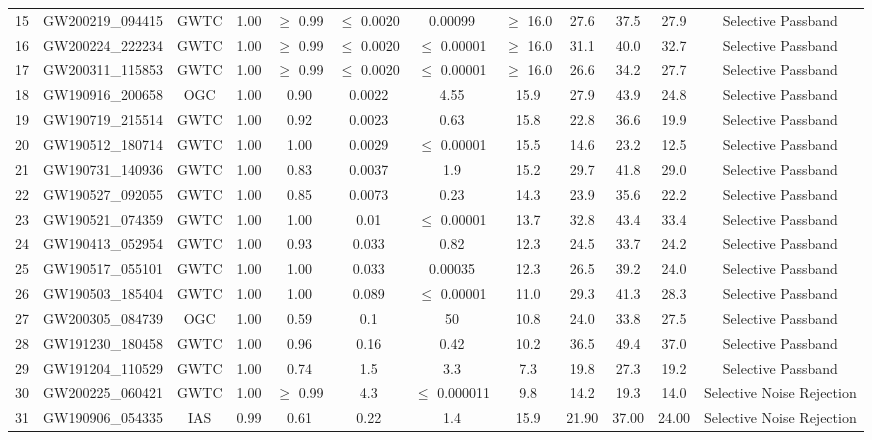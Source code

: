 \begin{tabular}{!{\vrule width 1pt}l|c|c|c|c|c|c|c|c|c|c|c!{\vrule width 1pt}}
15 & GW200219\_094415 & GWTC & 1.00 &  $\geq$ 0.99 & $\leq$ 0.0020 & 0.00099 & $\geq$ 16.0 & 27.6 & 37.5 & 27.9 & Selective Passband \\
16 & GW200224\_222234 & GWTC & 1.00 &  $\geq$ 0.99 & $\leq$ 0.0020 & $\leq$ 0.00001 & $\geq$ 16.0 & 31.1 & 40.0 & 32.7 & Selective Passband \\
17 & GW200311\_115853 & GWTC & 1.00 &  $\geq$ 0.99 & $\leq$ 0.0020 & $\leq$ 0.00001 & $\geq$ 16.0 & 26.6 & 34.2 & 27.7 & Selective Passband \\
18 & GW190916\_200658 & OGC & 1.00 & 0.90 & 0.0022 & 4.55 & 15.9 & 27.9 & 43.9 & 24.8 & Selective Passband \\
19 & GW190719\_215514 & GWTC & 1.00 & 0.92 & 0.0023 & 0.63 & 15.8 & 22.8 & 36.6 & 19.9 & Selective Passband  \\
20 & GW190512\_180714 & GWTC & 1.00 & 1.00 & 0.0029 & $\leq$ 0.00001 & 15.5 & 14.6 & 23.2 & 12.5 & Selective Passband \\
21 & GW190731\_140936 & GWTC & 1.00 & 0.83 & 0.0037 & 1.9 & 15.2 & 29.7 & 41.8 & 29.0 & Selective Passband  \\
22 & GW190527\_092055 & GWTC & 1.00 & 0.85 & 0.0073 & 0.23 & 14.3 & 23.9 & 35.6 & 22.2 & Selective Passband  \\
23 & GW190521\_074359 & GWTC & 1.00 & 1.00 & 0.01 &  $\leq$ 0.00001 & 13.7 & 32.8 & 43.4 & 33.4 & Selective Passband  \\
24 & GW190413\_052954 & GWTC & 1.00 & 0.93 & 0.033 & 0.82 & 12.3 & 24.5 & 33.7 & 24.2 & Selective Passband  \\
25 & GW190517\_055101 & GWTC & 1.00 & 1.00 & 0.033 & 0.00035 & 12.3 & 26.5 & 39.2 & 24.0 & Selective Passband  \\
26 & GW190503\_185404 & GWTC & 1.00 & 1.00 & 0.089 &  $\leq$ 0.00001 & 11.0 & 29.3 & 41.3 & 28.3 & Selective Passband  \\ 
27 & GW200305\_084739 & OGC & 1.00 & 0.59 & 0.1 & 50 & 10.8 & 24.0 & 33.8 & 27.5 & Selective Passband \\
28 & GW191230\_180458 & GWTC & 1.00 & 0.96 & 0.16 & 0.42 & 10.2 & 36.5 & 49.4 & 37.0 & Selective Passband\\
29 & GW191204\_110529 & GWTC & 1.00 & 0.74 & 1.5 & 3.3 & 7.3 & 19.8 & 27.3 & 19.2  & Selective Passband \\   
30 & GW200225\_060421 & GWTC & 1.00 &  $\geq$ 0.99 & 4.3& $\leq$ 0.000011 & 9.8 & 14.2 & 19.3 & 14.0 & Selective Noise Rejection \\
31 & GW190906\_054335 & IAS  & 0.99 & 0.61 & 0.22 & 1.4 & 15.9 & 21.90 & 37.00 & 24.00 & Selective Noise Rejection \\

\end{tabular}
